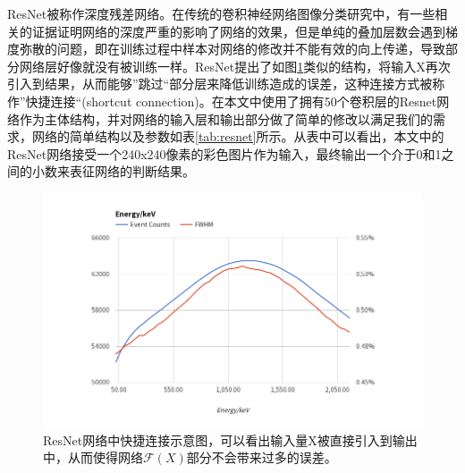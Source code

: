 ResNet被称作深度残差网络。在传统的卷积神经网络图像分类研究中，有一些相关的证据证明网络的深度严重的影响了网络的效果，但是单纯的叠加层数会遇到梯度弥散的问题，即在训练过程中样本对网络的修改并不能有效的向上传递，导致部分网络层好像就没有被训练一样。ResNet提出了如图\ref{fig:resnet}类似的结构，将输入X再次引入到结果，从而能够”跳过“部分层来降低训练造成的误差，这种连接方式被称作”快捷连接“(shortcut connection)。在本文中使用了拥有50个卷积层的Resnet网络作为主体结构，并对网络的输入层和输出部分做了简单的修改以满足我们的需求，网络的简单结构以及参数如表\ref{tab:resnet}所示。从表中可以看出，本文中的ResNet网络接受一个240x240像素的彩色图片作为输入，最终输出一个介于0和1之间的小数来表征网络的判断结果。

\begin{figure}
    \centering
    \includegraphics[width=0.8\columnwidth]{pic/trigger_select.png}
    \caption{ResNet网络中快捷连接示意图，可以看出输入量X被直接引入到输出中，从而使得网络$\mathcal{F}(X)$部分不会带来过多的误差。}
    \label{fig:resnet}
\end{figure}
\renewcommand\arraystretch{1.0}
